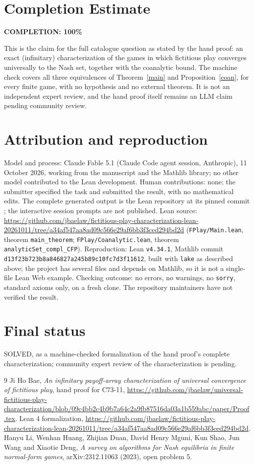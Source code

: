 \documentclass[11pt]{article}
\theoremstyle{definition}
\begin{document}
\section{Completion Estimate}
\noindent\textbf{COMPLETION: 100\%}

This is the claim for the full catalogue question as stated by the hand proof: an exact (infinitary) characterization of the games in which fictitious play converges universally to the Nash set, together with the coanalytic bound. The machine check covers all three equivalences of Theorem~\ref{main} and Proposition~\ref{coan}, for every finite game, with no hypothesis and no external theorem. It is not an independent expert review, and the hand proof itself remains an LLM claim pending community review.

\section*{Attribution and reproduction}
Model and process: Claude Fable 5.1 (Claude Code agent session, Anthropic), 11 October 2026, working from the manuscript \cite{Hand} and the Mathlib library; no other model contributed to the Lean development. Human contributions: none; the submitter specified the task and submitted the result, with no mathematical edits. The complete generated output is the Lean repository at its pinned commit \cite{Lean}; the interactive session prompts are not published. Lean source: \url{https://github.com/jbaelaw/fictitious-play-characterization-lean-20261011/tree/a34af547aa8ad09c566e29af6bb3f3ced294bd2d} (\texttt{FPlay/Main.lean}, theorem \texttt{main\_theorem}; \texttt{FPlay/Coanalytic.lean}, theorem \texttt{analyticSet\_compl\_CFP}). Reproduction: Lean \texttt{v4.34.1}, Mathlib commit \texttt{d13f23b723b8a846827a245b89c10fc7d3f11612}, built with \texttt{lake} as described above; the project has several files and depends on Mathlib, so it is not a single-file Lean Web example. Checking outcome: no errors, no warnings, no \texttt{sorry}, standard axioms only, on a fresh clone. The repository maintainers have not verified the result.

\section*{Final status}
SOLVED, as a machine-checked formalization of the hand proof's complete characterization; community expert review of the characterization is pending.

\begin{thebibliography}{9}
 Ji Ho Bae, \emph{An infinitary payoff-array characterization of universal convergence of fictitious play}, hand proof for C73-11, \url{https://github.com/jbaelaw/universal-fictitious-play-characterization/blob/09c4bb2c4b9b7a64c2a9fb87516da03a1b559abc/paper/Proof.tex}.
 Lean 4 formalization, \url{https://github.com/jbaelaw/fictitious-play-characterization-lean-20261011/tree/a34af547aa8ad09c566e29af6bb3f3ced294bd2d}.
 Hanyu Li, Wenhan Huang, Zhijian Duan, David Henry Mguni, Kun Shao, Jun Wang and Xiaotie Deng, \emph{A survey on algorithms for Nash equilibria in finite normal-form games}, arXiv:2312.11063 (2023), open problem 5.
\end{thebibliography}
\end{document}
